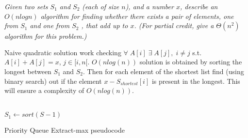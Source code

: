 \begin{problem}
\textit{Given two sets $S_1$ and $S_2$ (each of size $n$), and a number $x$, describe an $O(n log n)$
algorithm for finding whether there exists a pair of elements, one from $S_1$ and one
from $S_2$ , that add up to $x$. (For partial credit, give a $\Theta(n^2 )$ algorithm for this
problem.)}

\begin{solution}
Naive quadratic solution work checking $\forall \;A[i] \; \exists \; A[j],\; i \neq j$ s.t. $A[i]+A[j] =x$, $j \in [i,n[$.
$O(nlog(n))$ solution is obtained by sorting the longest between $S_1$ and $S_2$. Then for each element of the shortest list find (using binary search) out if the element $x-S_{shortest}[i]$ is present in the longest. This will ensure a complexity of $O(nlog(n))$.
\hfill \\ \hfill \\
\begin{algorithm}[H]
 $S_1 \gets sort(S-1)$\;
\;
\caption{Priority Queue Extract-max pseudocode}
\end{algorithm}



\end{solution}
\end{problem}


